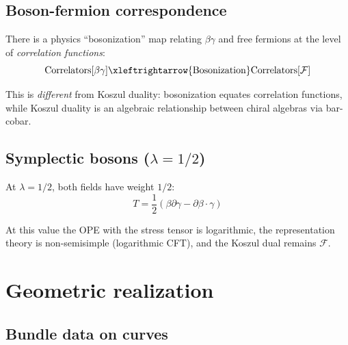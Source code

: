 \subsection{Boson-fermion correspondence}

\begin{theorem}
\label{thm:physical-bosonization}
There is a physics ``bosonization'' map relating $\beta\gamma$ and free fermions at the level of 
\emph{correlation functions}:
\[\text{Correlators}[\beta\gamma] \xleftrightarrow{\text{Bosonization}} \text{Correlators}[\mathcal{F}]\]

This is \emph{different} from Koszul duality: bosonization equates correlation functions, while Koszul duality is an algebraic relationship between chiral algebras via bar-cobar.
\end{theorem}

\subsection{\texorpdfstring{Symplectic bosons ($\lambda = 1/2$)}{Symplectic bosons ( = 1/2)}}

At $\lambda = 1/2$, both fields have weight $1/2$:
\[T = \frac{1}{2}(\beta\partial\gamma - \partial\beta \cdot \gamma)\]

At this value the OPE with the stress tensor is logarithmic, the representation theory is non-semisimple (logarithmic CFT), and the Koszul dual remains $\mathcal{F}$.

\section{Geometric realization}

\subsection{Bundle data on curves}

